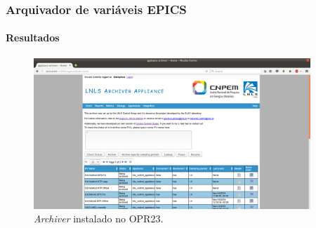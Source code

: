 \begin{frame}
\frametitle {Arquivador de variáveis EPICS}
\framesubtitle{Resultados}

\begin{figure}[h]

\centering
\includegraphics[width=0.93\textwidth]{image/archiver}
\caption {\textit{Archiver} instalado no OPR23.}
\label{fig:archiver}
\end{figure}

\end{frame}